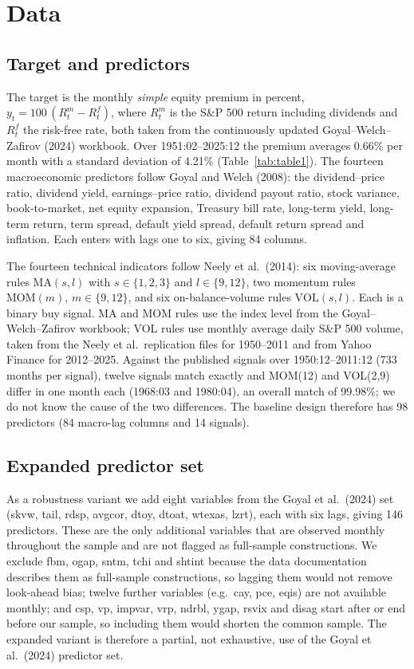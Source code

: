 \documentclass[11pt,a4paper]{article}
\begin{document}
\section{Data}\label{sec:data}

\subsection{Target and predictors}\label{sec:data:sources}
The target is the monthly \emph{simple} equity premium in percent,
$y_t = 100\,(R^m_t - R^f_t)$, where $R^m_t$ is the S\&P 500 return including
dividends and $R^f_t$ the risk-free rate, both taken from the continuously
updated Goyal--Welch--Zafirov (2024) workbook. Over 1951:02--2025:12 the
premium averages 0.66\% per month with a standard deviation of 4.21\%
(Table~\ref{tab:table1}). The fourteen macroeconomic predictors follow Goyal
and Welch (2008): the dividend--price ratio, dividend yield,
earnings--price ratio, dividend payout ratio, stock variance,
book-to-market, net equity expansion, Treasury bill rate, long-term yield,
long-term return, term spread, default yield spread, default return spread
and inflation. Each enters with lags one to six, giving 84 columns.

The fourteen technical indicators follow Neely et al.\ (2014): six
moving-average rules $\mathrm{MA}(s,l)$ with $s\in\{1,2,3\}$ and
$l\in\{9,12\}$, two momentum rules $\mathrm{MOM}(m)$, $m\in\{9,12\}$, and six
on-balance-volume rules $\mathrm{VOL}(s,l)$. Each is a binary buy signal.
MA and MOM rules use the index level from the Goyal--Welch--Zafirov workbook;
VOL rules use monthly average daily S\&P 500 volume, taken from the Neely et
al.\ replication files for 1950--2011 and from Yahoo Finance for 2012--2025.
Against the published signals over 1950:12--2011:12 (733 months per
signal), twelve signals match exactly and MOM(12) and VOL(2,9) differ in one
month each (1968:03 and 1980:04), an overall match of 99.98\%; we do not
know the cause of the two differences. The baseline design therefore has
98 predictors (84 macro-lag columns and 14 signals).

\subsection{Expanded predictor set}\label{sec:data:expanded}
As a robustness variant we add eight variables from the Goyal et al.\ (2024)
set (skvw, tail, rdsp, avgcor, dtoy, dtoat, wtexas, lzrt), each with six
lags, giving 146 predictors. These are the only additional variables that
are observed monthly throughout the sample and are not flagged as
full-sample constructions. We exclude fbm, ogap, sntm, tchi and shtint
because the data documentation describes them as full-sample constructions,
so lagging them would not remove look-ahead bias; twelve further variables
(e.g.\ cay, pce, eqis) are not available monthly; and csp, vp, impvar, vrp,
ndrbl, ygap, rsvix and disag start after or end before our sample, so
including them would shorten the common sample. The expanded variant is
therefore a partial, not exhaustive, use of the Goyal et al.\ (2024)
predictor set.
\end{document}
